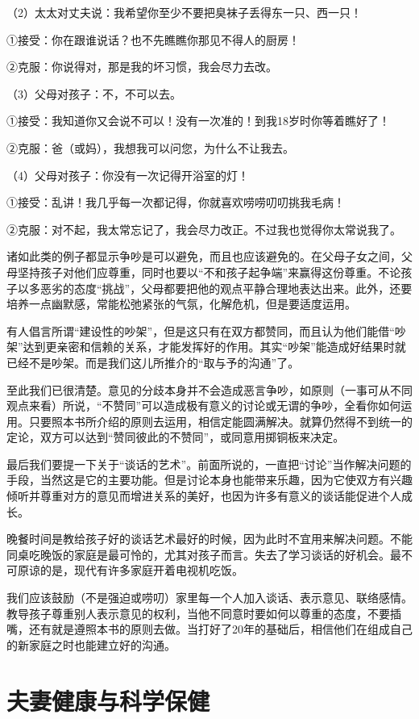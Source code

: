 \documentclass[12pt,UTF8,openany]{ctexbook}
\begin{document}
（2）太太对丈夫说：我希望你至少不要把臭袜子丢得东一只、西一只！

①接受：你在跟谁说话？也不先瞧瞧你那见不得人的厨房！

②克服：你说得对，那是我的坏习惯，我会尽力去改。

（3）父母对孩子：不，不可以去。

①接受：我知道你又会说不可以！没有一次准的！到我18岁时你等着瞧好了！

②克服：爸（或妈），我想我可以问您，为什么不让我去。

（4）父母对孩子：你没有一次记得开浴室的灯！

①接受：乱讲！我几乎每一次都记得，你就喜欢唠唠叨叨挑我毛病！

②克服：对不起，我太常忘记了，我会尽力改正。不过我也觉得你太常说我了。

诸如此类的例子都显示争吵是可以避免，而且也应该避免的。在父母子女之间，父母坚持孩子对他们应尊重，同时也要以“不和孩子起争端”来赢得这份尊重。不论孩子以多恶劣的态度“挑战”，父母都要把他的观点平静合理地表达出来。此外，还要培养一点幽默感，常能松弛紧张的气氛，化解危机，但是要适度运用。

有人倡言所谓“建设性的吵架”，但是这只有在双方都赞同，而且认为他们能借“吵架”达到更亲密和信赖的关系，才能发挥好的作用。其实“吵架”能造成好结果时就已经不是吵架。而是我们这儿所推介的“取与予的沟通”了。

至此我们已很清楚。意见的分歧本身并不会造成恶言争吵，如原则（一事可从不同观点来看）所说，“不赞同”可以造成极有意义的讨论或无谓的争吵，全看你如何运用。只要照本书所介绍的原则去运用，相信定能圆满解决。就算仍然得不到统一的定论，双方可以达到“赞同彼此的不赞同”，或同意用掷铜板来决定。

最后我们要提一下关于“谈话的艺术”。前面所说的，一直把“讨论”当作解决问题的手段，当然这是它的主要功能。但是讨论本身也能带来乐趣，因为它使双方有兴趣倾听并尊重对方的意见而增进关系的美好，也因为许多有意义的谈话能促进个人成长。

晚餐时间是教给孩子好的谈话艺术最好的时候，因为此时不宜用来解决问题。不能同桌吃晚饭的家庭是最可怜的，尤其对孩子而言。失去了学习谈话的好机会。最不可原谅的是，现代有许多家庭开着电视机吃饭。

我们应该鼓励（不是强迫或唠叨）家里每一个人加入谈话、表示意见、联络感情。教导孩子尊重别人表示意见的权利，当他不同意时要如何以尊重的态度，不要插嘴，还有就是遵照本书的原则去做。当打好了20年的基础后，相信他们在组成自己的新家庭之时也能建立好的沟通。





\part{夫妻健康与科学保健}
\end{document}

